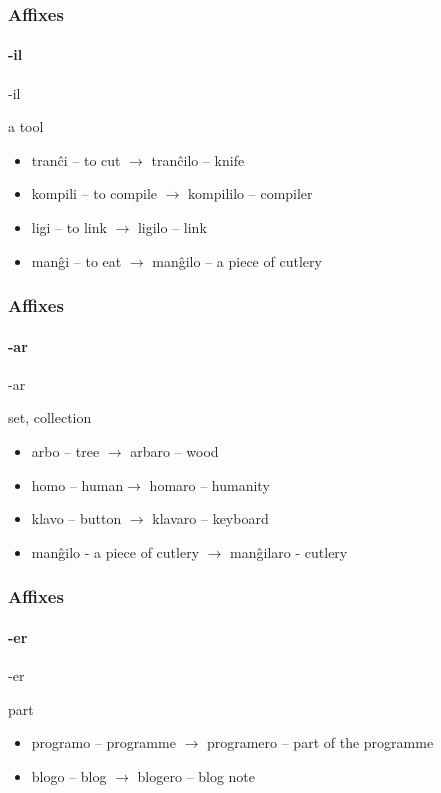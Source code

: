 \documentclass{beamer}
\begin{document}
  \begin{frame}
  	\frametitle{Affixes}
  	\framesubtitle{-il}
  	  	
  		\begin{block}{-il}
  			\begin{center}
  				a tool
  			\end{center}
  		\end{block}
  	
  		\begin{itemize}
  			\item<1-> tranĉi -- to cut $\rightarrow$ tranĉilo -- knife
  			\item<1-> kompili -- to compile $\rightarrow$ kompililo -- compiler
  			\item<1-> ligi -- to link $\rightarrow$ ligilo -- link
  			\item<2-> manĝi -- to eat $\rightarrow$ \pause manĝilo -- a piece of cutlery
  		\end{itemize}
  \end{frame}

  \begin{frame}
  	\frametitle{Affixes}
  	\framesubtitle{-ar}
  	  	
  		\begin{block}{-ar}
  			\begin{center}
  				set, collection
  			\end{center}
  		\end{block}
  	
  		\begin{itemize}
  			\item<1-> arbo -- tree $\rightarrow$ arbaro -- wood
  			\item<1-> homo -- human$\rightarrow$ homaro -- humanity
  			\item<1-> klavo -- button $\rightarrow$ klavaro -- keyboard
  			\item<2-> manĝilo - a piece of cutlery $\rightarrow$ \pause manĝilaro - cutlery
  		\end{itemize}
  \end{frame}

  \begin{frame}
  	\frametitle{Affixes}
  	\framesubtitle{-er}
  	  	
  		\begin{block}{-er}
  			\begin{center}
  			part
  			\end{center}
  		\end{block}
  	
  		\begin{itemize}
			\item<1-> programo -- programme $\rightarrow$ programero -- part of the programme
			\item<1-> blogo -- blog $\rightarrow$ blogero -- blog note
			
  		\end{itemize}
  \end{frame}
\end{document}
